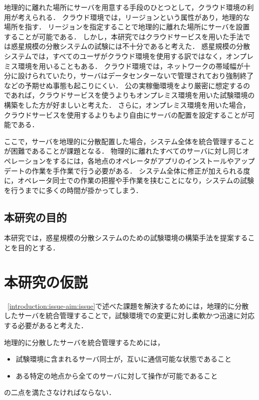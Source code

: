 地理的に離れた場所にサーバを用意する手段のひとつとして，クラウド環境の利用が考えられる．
クラウド環境では，リージョンという属性があり，地理的な場所を指す．
リージョンを指定することで地理的に離れた場所にサーバを設置することが可能である．
しかし，本研究ではクラウドサービスを用いた手法では惑星規模の分散システムの試験には不十分であると考えた．
惑星規模の分散システムでは，すべてのユーザがクラウド環境を使用する訳ではなく，オンプレミス環境を用いることもある．
クラウド環境では，ネットワークの帯域幅が十分に設けられていたり，サーバはデータセンターないで管理されており強制終了などの予期せぬ事態も起こりにくい．
公の実稼働環境をより厳密に想定するのであれば，クラウドサービスを使うよりもオンプレミス環境を用いた試験環境の構築をした方が好ましいと考えた．
さらに，オンプレミス環境を用いた場合，クラウドサービスを使用するよりもより自由にサーバの配置を設定することが可能である．

ここで，サーバを地理的に分散配置した場合，システム全体を統合管理することが困難であることが課題となる．
物理的に離れたすべてのサーバに対し同じオペレーションをするには，各地点のオペレータがアプリのインストールやアップデートの作業を手作業で行う必要がある．
システム全体に修正が加えられる度に，オペレータ同士での作業の把握や手作業を挟むことになり，システムの試験を行うまでに多くの時間が掛かってしまう．

\subsection{本研究の目的}
\label{introduction:issue-aim:aim}

本研究では，惑星規模の分散システムのための試験環境の構築手法を提案することを目的とする．

\section{本研究の仮説}
\label{introduction:hypothesis}

~\ref{introduction:issue-aim:issue}で述べた課題を解決するためには，地理的に分散したサーバを統合管理することで，試験環境での変更に対し柔軟かつ迅速に対応する必要があると考えた．

地理的に分散したサーバを統合管理するためには，
\begin{itemize}
  \item 試験環境に含まれるサーバ同士が，互いに通信可能な状態であること
  \item ある特定の地点から全てのサーバに対して操作が可能であること
\end{itemize}
の二点を満たさなければならない．

